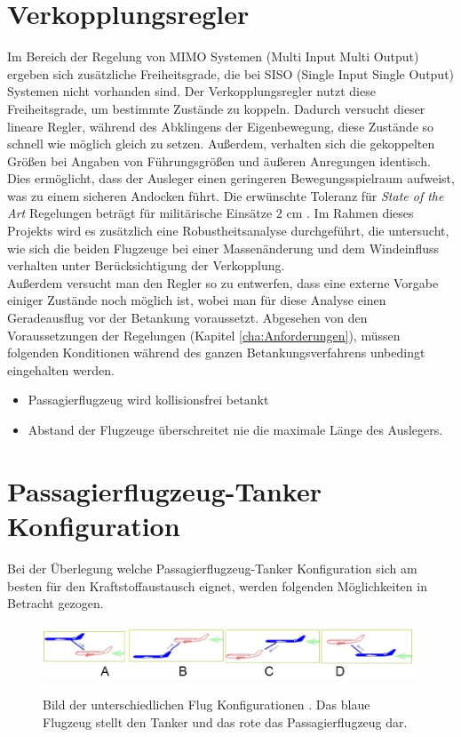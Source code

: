 \section*{ Verkopplungsregler}
Im Bereich der Regelung von MIMO Systemen (Multi Input Multi Output) ergeben sich zusätzliche Freiheitsgrade, die bei SISO (Single Input Single Output) Systemen nicht vorhanden sind. Der Verkopplungsregler nutzt diese Freiheitsgrade, um bestimmte Zustände zu koppeln. Dadurch versucht dieser lineare Regler, während des Abklingens der Eigenbewegung, diese Zustände so schnell wie möglich gleich zu setzen. Außerdem, verhalten sich die gekoppelten Größen bei Angaben von Führungsgrößen und äußeren Anregungen identisch. Dies ermöglicht, dass der Ausleger einen geringeren Bewegungsspielraum aufweist, was zu einem sicheren Andocken führt. Die erwünschte Toleranz für \textit{State of the Art} Regelungen beträgt für militärische Einsätze $2$ cm \cite{Autonom1}.  Im Rahmen dieses Projekts wird es zusätzlich eine Robustheitsanalyse durchgeführt, die untersucht, wie sich die beiden Flugzeuge bei einer Massenänderung und dem Windeinfluss verhalten unter Berücksichtigung der Verkopplung.\\
Außerdem versucht man den Regler so zu entwerfen, dass eine externe Vorgabe einiger Zustände noch möglich ist, wobei man für diese Analyse einen Geradeausflug vor der Betankung voraussetzt. Abgesehen von den Voraussetzungen der Regelungen (Kapitel \ref{cha:Anforderungen}), müssen folgenden Konditionen während des ganzen Betankungsverfahrens unbedingt eingehalten werden.
\begin{itemize}
    \item Passagierflugzeug wird kollisionsfrei betankt
    \item Abstand der Flugzeuge überschreitet nie die maximale Länge des Auslegers. 
    
\end{itemize}
\section{Passagierflugzeug-Tanker Konfiguration}
Bei der Überlegung welche Passagierflugzeug-Tanker Konfiguration sich am besten für den Kraftstoffaustausch eignet, werden folgenden Möglichkeiten in Betracht gezogen.
\begin{figure}[h]
\centering 
\includegraphics[scale=0.6]{./Bilder/Konfiguration.jpg}
\label{fig:Konfigurationen}
\caption{Bild der unterschiedlichen Flug Konfigurationen \cite{RefuelingTime}. Das blaue Flugzeug stellt den Tanker und das rote das Passagierflugzeug dar.}
\end{figure}

